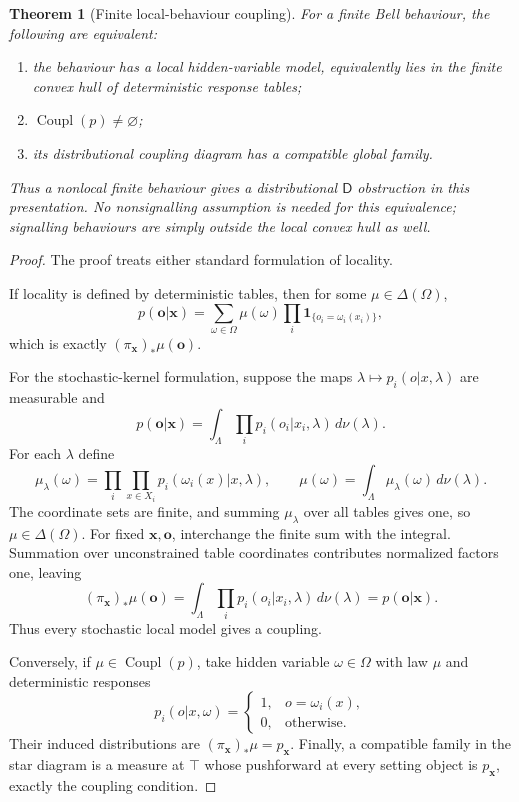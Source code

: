 \documentclass[11pt]{article}
\theoremstyle{plain}
\newtheorem{theorem}{Theorem}[section]
\theoremstyle{definition}
\theoremstyle{remark}
\begin{document}
\begin{theorem}[Finite local-behaviour coupling]\label{thm:bell}
For a finite Bell behaviour, the following are equivalent:
\begin{enumerate}[label=(\roman*)]
\item the behaviour has a local hidden-variable model, equivalently lies in the
finite convex hull of deterministic response tables;
\item $\operatorname{Coupl}(p)\ne\varnothing$;
\item its distributional coupling diagram has a compatible global family.
\end{enumerate}
Thus a nonlocal finite behaviour gives a distributional $\mathsf D$ obstruction
in this presentation. No nonsignalling assumption is needed for this equivalence;
signalling behaviours are simply outside the local convex hull as well.
\end{theorem}

\begin{proof}
The proof treats either standard formulation of locality.

If locality is defined by deterministic tables, then for some
$\mu\in\Delta(\Omega)$,
\[
p(\mathbf o|\mathbf x)=
\sum_{\omega\in\Omega}\mu(\omega)
\prod_i\mathbf 1_{\{o_i=\omega_i(x_i)\}},
\]
which is exactly $(\pi_{\mathbf x})_*\mu(\mathbf o)$.

For the stochastic-kernel formulation, suppose the maps
$\lambda\mapsto p_i(o|x,\lambda)$ are measurable and
\[
p(\mathbf o|\mathbf x)=
\int_\Lambda\prod_i p_i(o_i|x_i,\lambda)\,d\nu(\lambda).
\]
For each $\lambda$ define
\[
\mu_\lambda(\omega)=
\prod_i\prod_{x\in X_i}p_i(\omega_i(x)|x,\lambda),
\qquad
\mu(\omega)=\int_\Lambda\mu_\lambda(\omega)\,d\nu(\lambda).
\]
The coordinate sets are finite, and summing $\mu_\lambda$ over all tables gives
one, so $\mu\in\Delta(\Omega)$. For fixed $\mathbf x,\mathbf o$, interchange
the finite sum with the integral. Summation over unconstrained table coordinates
contributes normalized factors one, leaving
\[
(\pi_{\mathbf x})_*\mu(\mathbf o)
=\int_\Lambda\prod_i p_i(o_i|x_i,\lambda)\,d\nu(\lambda)
=p(\mathbf o|\mathbf x).
\]
Thus every stochastic local model gives a coupling.

Conversely, if $\mu\in\operatorname{Coupl}(p)$, take hidden variable
$\omega\in\Omega$ with law $\mu$ and deterministic responses
\[
p_i(o|x,\omega)=
\begin{cases}1,&o=\omega_i(x),\\0,&\text{otherwise}.
\end{cases}
\]
Their induced distributions are $(\pi_{\mathbf x})_*\mu=p_{\mathbf x}$.
Finally, a compatible family in the star diagram is a measure at $\top$ whose
pushforward at every setting object is $p_{\mathbf x}$, exactly the coupling
condition.
\end{proof}
\end{document}
